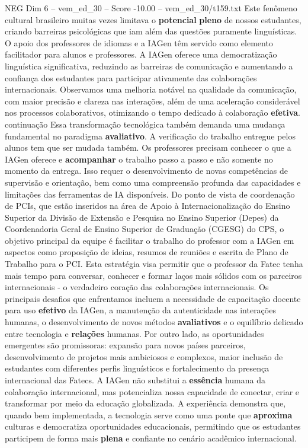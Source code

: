 \begin{textsample}{NEG Dim 6 – vem\_ed\_30 – Score -10.00 – vem\_ed\_30/t159.txt}
Este fenômeno cultural brasileiro muitas vezes limitava o \textbf{potencial} \textbf{pleno} de nossos estudantes, criando barreiras psicológicas que iam além das questões puramente linguísticas.
O apoio dos professores de idiomas e a IAGen têm servido como elemento facilitador para alunos e professores.
A IAGen oferece uma democratização linguística significativa, reduzindo as barreiras de comunicação e aumentando a confiança dos estudantes para participar ativamente das colaborações internacionais.
Observamos uma melhoria notável na qualidade da comunicação, com maior precisão e clareza nas interações, além de uma aceleração considerável nos processos colaborativos, otimizando o tempo dedicado à colaboração \textbf{efetiva}. continuação Essa transformação tecnológica também demanda uma mudança fundamental no paradigma \textbf{avaliativo}.
A verificação do trabalho entregue pelos alunos tem que ser mudada também.
Os professores precisam conhecer o que a IAGen oferece e \textbf{acompanhar} o trabalho passo a passo e não somente no momento da entrega.
Isso requer o desenvolvimento de novas competências de supervisão e orientação, bem como uma compreensão profunda das capacidades e limitações das ferramentas de IA disponíveis.
Do ponto de vista de coordenação de PCIs, que estão inseridos na área de Apoio à Internacionalização do Ensino Superior da Divisão de Extensão e Pesquisa no Ensino Superior (Depes) da Coordenadoria Geral de Ensino Superior de Graduação (CGESG) do CPS, o objetivo principal da equipe é facilitar o trabalho do professor com a IAGen em aspectos como proposição de ideias, resumos de reuniões e escrita de Plano de Trabalho para o PCI.
Esta estratégia visa permitir que o professor da Fatec tenha mais tempo para conversar, conhecer e formar laços mais sólidos com os parceiros internacionais - o verdadeiro coração das colaborações internacionais.
Os principais desafios que enfrentamos incluem a necessidade de capacitação docente para uso \textbf{efetivo} da IAGen, a manutenção da autenticidade nas interações humanas, o desenvolvimento de novos métodos \textbf{avaliativos} e o equilíbrio delicado entre tecnologia e \textbf{relações} humanas.
Por outro lado, as oportunidades emergentes são promissoras: expansão para novos países parceiros, desenvolvimento de projetos mais ambiciosos e complexos, maior inclusão de estudantes com diferentes perfis linguísticos e fortalecimento da presença internacional das Fatecs.
A IAGen não substitui a \textbf{essência} humana da colaboração internacional, mas potencializa nossa capacidade de conectar, criar e transformar por meio da educação globalizada.
A experiência demonstra que, quando bem implementada, a tecnologia serve como uma ponte que \textbf{aproxima} culturas e democratiza oportunidades educacionais, permitindo que os estudantes participem de forma mais \textbf{plena} e confiante no cenário acadêmico internacional.

\end{textsample}
